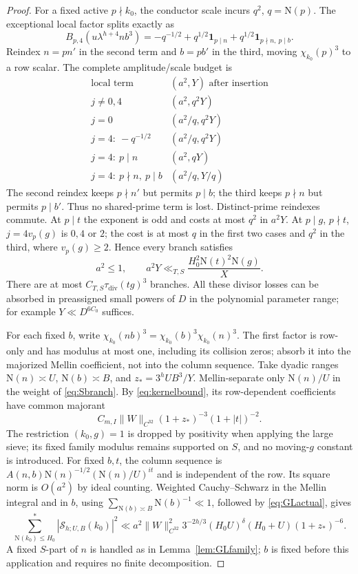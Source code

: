 \documentclass[11pt,a4paper]{article}
\numberwithin{equation}{section}
\theoremstyle{definition}
\theoremstyle{remark}
\newcommand{\N}{\mathrm N}
\newcommand{\ind}{\mathbf 1}
\newcommand{\tauD}{\tau_{\mathrm{div}}}
\begin{document}
\begin{proof}
For a fixed active $p\nmid k_0$, the conductor scale incurs $q^2$, $q=\N(p)$. The exceptional local factor splits exactly as
\[
 B_{p,4}(u\lambda^{h+4}nb^3)=-q^{-1/2}+q^{1/2}\ind_{p\mid n}+q^{1/2}\ind_{p\nmid n,\ p\mid b}.
\]
Reindex $n=pn'$ in the second term and $b=pb'$ in the third, moving $\chi_{k_0}(p)^3$ to a row scalar. The complete amplitude/scale budget is
\[
\begin{array}{c|c}
 \text{local term}&(a^2,Y)\text{ after insertion}\\\hline
 j\ne0,4&(a^2,q^2Y)\\
 j=0&(a^2/q,q^2Y)\\
 j=4:\ -q^{-1/2}&(a^2/q,q^2Y)\\
 j=4:\ p\mid n&(a^2,qY)\\
 j=4:\ p\nmid n,\ p\mid b&(a^2/q,Y/q)
\end{array}
\]
The second reindex keeps $p\nmid n'$ but permits $p\mid b$; the third keeps $p\nmid n$ but permits $p\mid b'$. Thus no shared-prime term is lost. Distinct-prime reindexes commute. At $p\mid t$ the exponent is odd and costs at most $q^2$ in $a^2Y$. At $p\mid g$, $p\nmid t$, $j=4v_p(g)$ is $0,4$ or $2$; the cost is at most $q$ in the first two cases and $q^2$ in the third, where $v_p(g)\ge2$. Hence every branch satisfies
\begin{equation}\label{eq:budget}
 a^2\le1,\qquad a^2Y\ll_{T,S}\frac{H_0^2\N(t)^2\N(g)}X.
\end{equation}
There are at most $C_{T,S}\tauD(tg)^3$ branches. All these divisor losses can be absorbed in preassigned small powers of $D$ in the polynomial parameter range; for example $Y\ll D^{6C_0}$ suffices.

For each fixed $b$, write $\chi_{k_0}(nb)^3=\chi_{k_0}(b)^3\chi_{k_0}(n)^3$. The first factor is row-only and has modulus at most one, including its collision zeros; absorb it into the majorized Mellin coefficient, not into the column sequence. Take dyadic ranges $\N(n)\asymp U$, $\N(b)\asymp B$, and $z_*=3^hUB^3/Y$. Mellin-separate only $\N(n)/U$ in the weight of \eqref{eq:Sbranch}. By \eqref{eq:kernelbound}, its row-dependent coefficients have common majorant
\[
 C_{m,I}\|W\|_{C^{32}}(1+z_*)^{-3}(1+|t|)^{-2}.
\]
The restriction $(k_0,g)=1$ is dropped by positivity when applying the large sieve; its fixed family modulus remains supported on $S$, and no moving-$g$ constant is introduced. For fixed $b,t$, the column sequence is $A(n,b)\N(n)^{-1/2}(\N(n)/U)^{it}$ and is independent of the row. Its square norm is $O(a^2)$ by ideal counting. Weighted Cauchy--Schwarz in the Mellin integral and in $b$, using $\sum_{\N(b)\asymp B}\N(b)^{-1}\ll1$, followed by \eqref{eq:GLactual}, gives
\begin{equation}\label{eq:blockenergy}
 \sum_{\N(k_0)\le H_0}^{*}|\mathscr S_{h;U,B}(k_0)|^2
 \ll a^2\|W\|_{C^{32}}^2 3^{-2h/3}(H_0U)^\delta(H_0+U)(1+z_*)^{-6}.
\end{equation}
A fixed $S$-part of $n$ is handled as in Lemma~\ref{lem:GLfamily}; $b$ is fixed before this application and requires no finite decomposition.


\end{proof}
\end{document}
